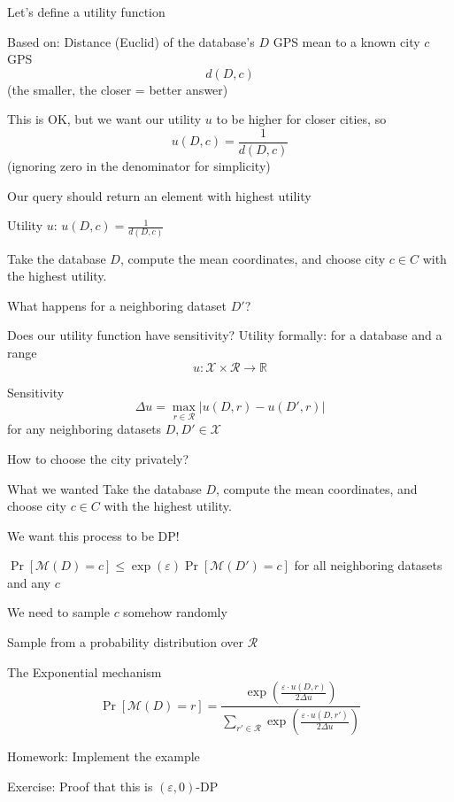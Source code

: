 \documentclass[12pt,aspectratio=169,handout]{beamer}
\begin{document}
\begin{frame}{Let's define a utility function}

Based on: Distance (Euclid) of the database's $D$ GPS mean to a known city $c$ GPS
$$d(D, c)$$
(the smaller, the closer = better answer)

This is OK, but we want our utility $u$ to be higher for closer cities, so
$$
u(D, c) = \frac{1}{d(D, c)}
$$
(ignoring zero in the denominator for simplicity)

\end{frame}


\begin{frame}{Our query should return an element with highest utility}

Utility $u$: $u(D, c) = \frac{1}{d(D, c)}$

Take the database $D$, compute the mean coordinates, and choose city $c \in C$ with the highest utility.

What happens for a neighboring dataset $D'$?
\end{frame}


\begin{frame}{Does our utility function have sensitivity?}
Utility formally: for a database and a range
$$
u: \mathcal{X} \times \mathcal{R} \to \mathbb{R}
$$

Sensitivity
$$
\Delta u = \max_{r \in \mathcal{R}} |u(D, r) - u(D', r)|
$$
for any neighboring datasets $D, D' \in \mathcal{X}$
\end{frame}

\begin{frame}{How to choose the city privately?}

\begin{block}{What we wanted}
Take the database $D$, compute the mean coordinates, and choose city $c \in C$ with the highest utility.
\end{block}

We want this process to be DP!

$\Pr[\mathcal{M}(D) =c] \leq \exp(\varepsilon) \Pr[\mathcal{M}(D') = c]$ for all neighboring datasets and any $c$

We need to sample $c$ somehow randomly
\end{frame}


\begin{frame}{Sample from a probability distribution over $\mathcal{R}$}

The Exponential mechanism
$$
\Pr [ \mathcal{M}(D) = r] = \frac{\exp \left( \frac{\varepsilon \cdot u(D, r)}{2 \Delta u} \right)}{\sum_{r' \in \mathcal{R}} \exp \left( \frac{\varepsilon \cdot u(D, r')}{2 \Delta u} \right)}
$$

Homework: Implement the example

Exercise: Proof that this is $(\varepsilon, 0)$-DP

\end{frame}
\end{document}
